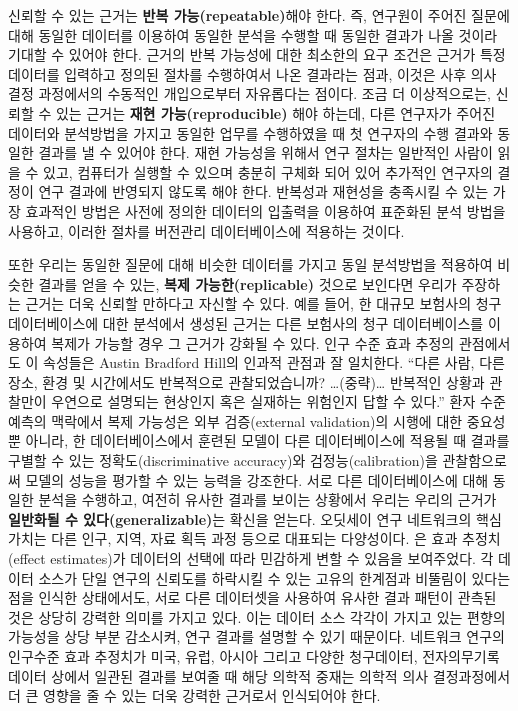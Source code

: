 \documentclass[11pt]{book}
\theoremstyle{definition}
\theoremstyle{definition}
\theoremstyle{definition}
\theoremstyle{remark}
\begin{document}
신뢰할 수 있는 근거는 \textbf{반복 가능(repeatable)}해야 한다. 즉,
연구원이 주어진 질문에 대해 동일한 데이터를 이용하여 동일한 분석을
수행할 때 동일한 결과가 나올 것이라 기대할 수 있어야 한다. 근거의 반복
가능성에 대한 최소한의 요구 조건은 근거가 특정 데이터를 입력하고 정의된
절차를 수행하여서 나온 결과라는 점과, 이것은 사후 의사 결정 과정에서의
수동적인 개입으로부터 자유롭다는 점이다. 조금 더 이상적으로는, 신뢰할 수
있는 근거는 \textbf{재현 가능(reproducible)} 해야 하는데, 다른 연구자가
주어진 데이터와 분석방법을 가지고 동일한 업무를 수행하였을 때 첫
연구자의 수행 결과와 동일한 결과를 낼 수 있어야 한다. 재현 가능성을
위해서 연구 절차는 일반적인 사람이 읽을 수 있고, 컴퓨터가 실행할 수
있으며 충분히 구체화 되어 있어 추가적인 연구자의 결정이 연구 결과에
반영되지 않도록 해야 한다. 반복성과 재현성을 충족시킬 수 있는 가장
효과적인 방법은 사전에 정의한 데이터의 입출력을 이용하여 표준화된 분석
방법을 사용하고, 이러한 절차를 버전관리 데이터베이스에 적용하는 것이다.

또한 우리는 동일한 질문에 대해 비슷한 데이터를 가지고 동일 분석방법을
적용하여 비슷한 결과를 얻을 수 있는, \textbf{복제 가능한(replicable)}
것으로 보인다면 우리가 주장하는 근거는 더욱 신뢰할 만하다고 자신할 수
있다. 예를 들어, 한 대규모 보험사의 청구 데이터베이스에 대한 분석에서
생성된 근거는 다른 보험사의 청구 데이터베이스를 이용하여 복제가 가능할
경우 그 근거가 강화될 수 있다. 인구 수준 효과 추정의 관점에서도 이
속성들은 Austin Bradford Hill의 인과적 관점과 잘 일치한다. ``다른 사람,
다른 장소, 환경 및 시간에서도 반복적으로 관찰되었습니까?
\ldots{}(중략)\ldots{} 반복적인 상황과 관찰만이 우연으로 설명되는
현상인지 혹은 실재하는 위험인지 답할 수 있다.''\citep{hill_1965} 환자
수준 예측의 맥락에서 복제 가능성은 외부 검증(external validation)의
시행에 대한 중요성뿐 아니라, 한 데이터베이스에서 훈련된 모델이 다른
데이터베이스에 적용될 때 결과를 구별할 수 있는 정확도(discriminative
accuracy)와 검정능(calibration)을 관찰함으로써 모델의 성능을 평가할 수
있는 능력을 강조한다. 서로 다른 데이터베이스에 대해 동일한 분석을
수행하고, 여전히 유사한 결과를 보이는 상황에서 우리는 우리의 근거가
\textbf{일반화될 수 있다(generalizable)}는 확신을 얻는다. 오딧세이 연구
네트워크의 핵심 가치는 다른 인구, 지역, 자료 획득 과정 등으로 대표되는
다양성이다. \citet{madigan_2013} 은 효과 추정치(effect estimates)가
데이터의 선택에 따라 민감하게 변할 수 있음을 보여주었다. 각 데이터
소스가 단일 연구의 신뢰도를 하락시킬 수 있는 고유의 한계점과 비뚤림이
있다는 점을 인식한 상태에서도, 서로 다른 데이터셋을 사용하여 유사한 결과
패턴이 관측된 것은 상당히 강력한 의미를 가지고 있다. 이는 데이터 소스
각각이 가지고 있는 편향의 가능성을 상당 부분 감소시켜, 연구 결과를
설명할 수 있기 때문이다. 네트워크 연구의 인구수준 효과 추정치가 미국,
유럽, 아시아 그리고 다양한 청구데이터, 전자의무기록 데이터 상에서 일관된
결과를 보여줄 때 해당 의학적 중재는 의학적 의사 결정과정에서 더 큰
영향을 줄 수 있는 더욱 강력한 근거로서 인식되어야 한다.
\end{document}
